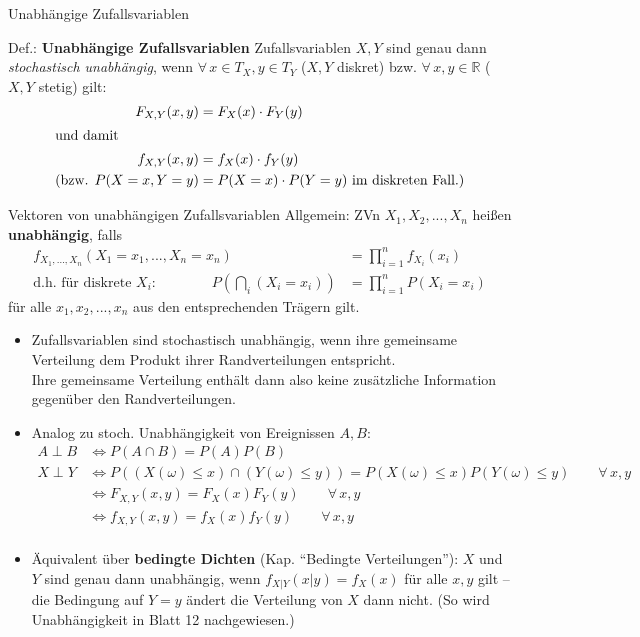 \documentclass[
  10pt,
  ignorenonframetext,
]{beamer}
\begin{document}
\begin{frame}{Unabhängige Zufallsvariablen}
\protect\hypertarget{unabhuxe4ngige-zufallsvariablen}{}
\begin{block}{Def.: \textbf{Unabhängige Zufallsvariablen}}
\protect\hypertarget{def.-unabhuxe4ngige-zufallsvariablen}{}
Zufallsvariablen \(X,Y\) sind genau dann \emph{stochastisch unabhängig},
wenn \(\forall\, x \in T_X, y \in T_Y\) (\(X, Y\) diskret) bzw.
\(\forall\, x,y \in \mathbb{R}\) (\(X, Y\) stetig) gilt: \begin{align*}
F_{X,Y}(x,y) & = F_X(x) \cdot F_Y(y)\\
\intertext{und damit }  f_{X,Y}(x,y) & =  f_X(x) \cdot f_Y(y) \\
\text{(bzw. }  P(X = x, Y = y) &= P(X = x) \cdot P(Y = y) \text{ im diskreten Fall.)}
\end{align*}
\end{block}
\end{frame}

\begin{frame}{Vektoren von unabhängigen Zufallsvariablen}
\protect\hypertarget{vektoren-von-unabhuxe4ngigen-zufallsvariablen}{}
Allgemein: ZVn \(X_1, X_2, ..., X_n\) heißen \textbf{unabhängig}, falls
\begin{align*}
f_{X_1, \dots, X_n}(X_1 = x_1, ..., X_n = x_n) &= \prod_{i=1}^n f_{X_i}(x_i) \\
\text{d.h. für diskrete $X_i$:}\qquad\qquad P\left(\bigcap_i (X_i = x_i)\right) &= \prod_{i=1}^n P(X_i = x_i) 
\end{align*} für alle \(x_1, x_2, ..., x_n\) aus den entsprechenden
Trägern gilt.

\begin{itemize}
\item
  Zufallsvariablen sind stochastisch unabhängig, wenn ihre gemeinsame
  Verteilung dem Produkt ihrer Randverteilungen entspricht.\\
  Ihre gemeinsame Verteilung enthält dann also keine zusätzliche
  Information gegenüber den Randverteilungen.
\item
  Analog zu stoch. Unabhängigkeit von Ereignissen \(A, B\):
  \begin{align*}
  A \perp B &\iff P(A\cap B) = P(A)P(B) \\ 
  X \perp Y &\iff P((X(\omega) \leq x) \cap (Y(\omega) \leq y)) = P(X(\omega) \leq x)P(Y(\omega) \leq y) \qquad \forall\, x,y \\
                          &\iff F_{X,Y}(x, y) = F_X(x)F_Y(y)  \qquad \forall\, x,y  \\
                          &\iff f_{X,Y}(x, y) = f_X(x)f_Y(y)  \qquad \forall\, x,y  \\
  \end{align*}
\item
  Äquivalent über \textbf{bedingte Dichten} (Kap. ``Bedingte
  Verteilungen''): \(X\) und \(Y\) sind genau dann unabhängig, wenn
  \(f_{X|Y}(x|y) = f_X(x)\) für alle \(x, y\) gilt -- die Bedingung auf
  \(Y=y\) ändert die Verteilung von \(X\) dann nicht. (So wird
  Unabhängigkeit in Blatt 12 nachgewiesen.)
\end{itemize}
\end{frame}
\end{document}
